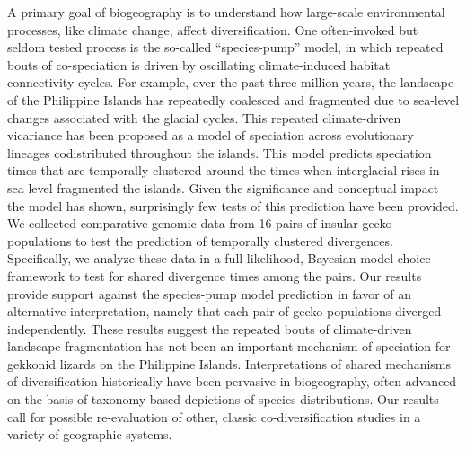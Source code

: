 A primary goal of biogeography is to understand how large-scale environmental
processes, like climate change, affect diversification.
One often-invoked but seldom tested process is the so-called ``species-pump''
model, in which repeated bouts of co-speciation is driven by oscillating
climate-induced habitat connectivity cycles.
For example, over the past three million years, the landscape of the Philippine
Islands has repeatedly coalesced and fragmented due to sea-level changes
associated with the glacial cycles.
This repeated climate-driven vicariance has been proposed as a model of
speciation across evolutionary lineages codistributed throughout the islands.
This model predicts speciation times that are temporally clustered around
the times when interglacial rises in sea level fragmented the islands.
Given the significance and conceptual impact the model has shown, surprisingly
few tests of this prediction have been provided.
We collected comparative genomic data from 16 pairs of insular gecko populations
to test the prediction of temporally clustered divergences.
Specifically, we analyze these data in a full-likelihood, Bayesian model-choice
framework to test for shared divergence times among the pairs.
Our results provide support against the species-pump model prediction in favor
of an alternative interpretation, namely that each pair of gecko populations
diverged independently.
These results suggest the repeated bouts of climate-driven landscape
fragmentation has not been an important mechanism of speciation for
gekkonid lizards on the Philippine Islands.
Interpretations of shared mechanisms of diversification historically have been
pervasive in biogeography, often advanced on the basis of taxonomy-based
depictions of species distributions.
Our results call for possible re-evaluation of other, classic
co-diversification studies in a variety of geographic systems.
